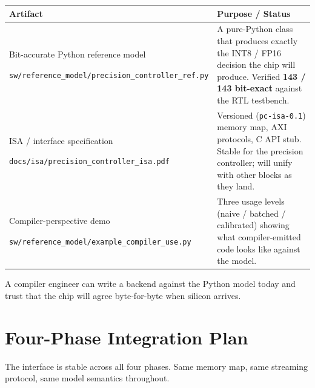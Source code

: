 \documentclass[11pt]{article}
\begin{document}
\begin{table}[h]
\centering
\small
\begin{tabular}{@{}p{} p{}@{}}
\toprule
Artifact                                          & Purpose / Status \\
\midrule
Bit-accurate Python reference model\par\hspace*{0.5em}\texttt{sw/reference\_model/precision\_controller\_ref.py}
& A pure-Python class that produces exactly the INT8 / FP16 decision the chip will produce. Verified \textbf{143 / 143 bit-exact} against the RTL testbench. \\[0.4em]
ISA / interface specification\par\hspace*{0.5em}\texttt{docs/isa/precision\_controller\_isa.pdf}
& Versioned (\texttt{pc-isa-0.1}) memory map, AXI protocols, C API stub. Stable for the precision controller; will unify with other blocks as they land. \\[0.4em]
Compiler-perspective demo\par\hspace*{0.5em}\texttt{sw/reference\_model/example\_compiler\_use.py}
& Three usage levels (naive / batched / calibrated) showing what compiler-emitted code looks like against the model. \\
\bottomrule
\end{tabular}
\end{table}

\noindent
A compiler engineer can write a backend against the Python model today
and trust that the chip will agree byte-for-byte when silicon arrives.

\section{Four-Phase Integration Plan}
\label{sec:phases}

The interface is stable across all four phases. Same memory map, same
streaming protocol, same model semantics throughout.
\end{document}
